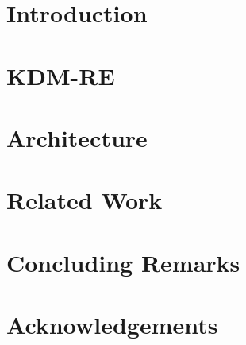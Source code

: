 \documentclass[12pt]{article}
\title{\papertitle}
\author{Rafael S. Durelli\inst{1}, Daniel S. M. Santib\'{a}\~{n}ez\inst{2} , M\'{a}rcio E. Delamaro\inst{1} \\and Valter V. de Camargo\inst{2}}
\begin{document}
 

\maketitle

\begin{abstract}

\end{abstract}
\section{Introduction\label{sec:introduction}}
 

% 

\section{KDM-RE\label{sec:KDM-RE}} 


%	


\section{Architecture\label{sec:architecture}}
 

\section{Related Work\label{sec:related}}
 

\section{Concluding Remarks\label{sec:conclusion}}
 

\section{Acknowledgements}
 



\end{document}
